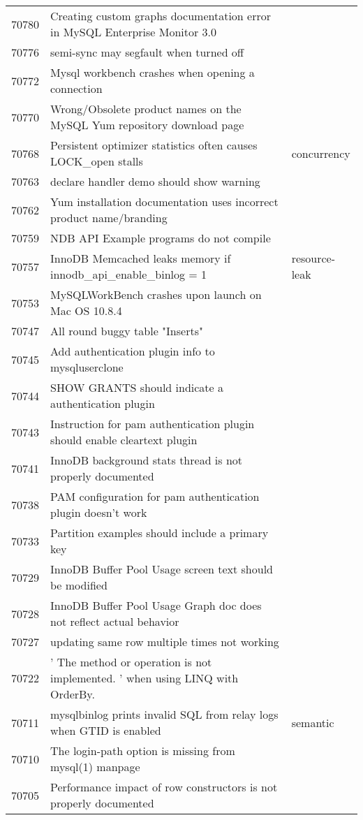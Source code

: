 \begin{longtable}[c]{p{1cm}p{10cm}p{1cm}}
70780 & Creating custom graphs documentation error in MySQL Enterprise Monitor 3.0 &  \\
70776 & semi-sync may segfault when turned off &  \\
70772 & Mysql workbench crashes when opening a connection &  \\
70770 & Wrong/Obsolete product names on the MySQL Yum repository download page &  \\
70768 & Persistent optimizer statistics often causes LOCK\_open stalls & concurrency \\
70763 & declare handler demo should show warning &  \\
70762 & Yum installation documentation uses incorrect product name/branding &  \\
70759 & NDB API Example programs do not compile &  \\
70757 & InnoDB Memcached leaks memory if innodb\_api\_enable\_binlog = 1 & resource-leak \\
70753 & MySQLWorkBench crashes upon launch on Mac OS 10.8.4 &  \\
70747 & All round buggy table "Inserts" &  \\
70745 & Add authentication plugin info to mysqluserclone &  \\
70744 & SHOW GRANTS should indicate a authentication plugin &  \\
70743 & Instruction for pam authentication plugin should enable cleartext plugin &  \\
70741 & InnoDB background stats thread is not properly documented &  \\
70738 & PAM configuration for pam authentication plugin doesn't work &  \\
70733 & Partition examples should include a primary key &  \\
70729 & InnoDB Buffer Pool Usage screen text should be modified &  \\
70728 & InnoDB Buffer Pool Usage Graph doc does not reflect actual behavior &  \\
70727 & updating same row multiple times not working &  \\
70722 & ' The method or operation is not implemented. ' when using LINQ with OrderBy. &  \\
70711 & mysqlbinlog prints invalid SQL from relay logs when GTID is enabled & semantic \\
70710 & The login-path option is missing from mysql(1) manpage &  \\
70705 & Performance impact of row constructors is not properly documented &  \\

\end{longtable}
